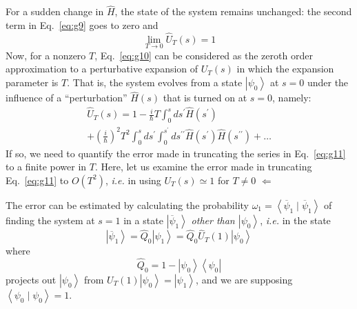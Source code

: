 \documentclass[12pt]{article}
\newcommand{\be}{\begin{equation}}
\newcommand{\ee}{\end{equation}}
\begin{document}
For a sudden change in $\hat{H}$, the state of the system
remains unchanged: the second term in Eq.~\eqref{eq:g9}
goes to zero and
\be
\lim_{T \rightarrow 0} \hat{U}_{T}(s)=1
\label{eq:g10}
\ee
Now, for a nonzero $T$, Eq.~\eqref{eq:g10} can be considered
as the zeroth order approximation to a perturbative
expansion of $U_{T}(s)$ in which the expansion parameter
is $T$. That is, the system evolves from a state $\left|\psi_{0}\right\rangle$
at $s=0$ under the influence of a ``perturbation'' $\hat{H}(s)$
that is turned on at $s=0$, namely:
\be
\begin{gathered}
\hat{U}_{T}(s)=1-\frac{i}{\hbar} T \int_{0}^{s} d s^{\prime} \hat{H}\left(s^{\prime}\right)\\
+\left(\frac{i}{\hbar}\right)^{2} T^{2} \int_{0}^{s} d s^{\prime} \int_{0}^{s^{\prime}} d s^{\prime \prime} \hat{H}\left(s^{\prime}\right) \hat{H}\left(s^{\prime \prime}\right)+\ldots
\end{gathered}
\label{eq:g11}
\ee
If so, we need to quantify the error made in
truncating the series in Eq.~\eqref{eq:g11} to a finite
power in $T$. Here, let us examine the error
made in truncating Eq.~\eqref{eq:g11} to $O\left(T^{2}\right)$, \textit{i.e.}
in using $U_{T}(s) \simeq 1$ for $T \neq 0$ $\Leftarrow$ 

The error can be estimated by calculating the
probability $\omega_{1}=\left\langle\overline{\psi}_{1} \mid \overline{\psi}_{1}\right\rangle$ of finding the system
at $s=1$ in a state $\left|\overline{\psi}_{1}\right\rangle$ \emph{other than $\left|\psi_{0}\right\rangle$},
\textit{i.e.} in the state
\be
\left|\overline{\psi}_{1}\right\rangle=\hat{Q}_{0}\left|\psi_{1}\right\rangle=\hat{Q}_{0} \hat{U}_{T}(1)\left|\psi_{0}\right\rangle
\ee
where
\be
\hat{Q}_{0}=1-\left|\psi_{0}\right\rangle\left\langle\psi_{0}\right|
\ee
projects out $\left|\psi_{0}\right\rangle$ from $U_{T}(1)\left|\psi_{0}\right\rangle=\left|\psi_{1}\right\rangle$,
and
we are supposing $\left\langle\psi_{0} \mid \psi_{0}\right\rangle=1$.
\end{document}
